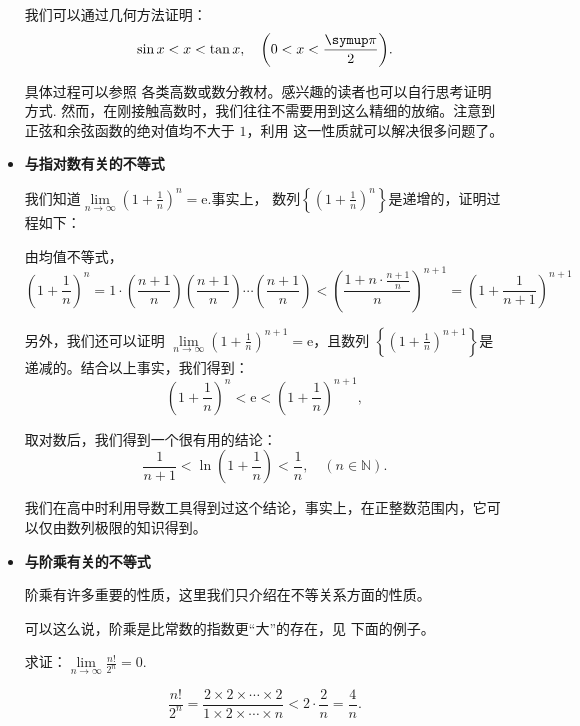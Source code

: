 \begin{itemize}
          我们可以通过几何方法证明：
          \[
              \sin x<x<\tan x,\quad\left( 0<x<\frac{\symup\pi}{2} \right)
              .\]

          具体过程可以参照%
          各类高数或数分教材。感兴趣的读者也可以自行思考证明方式.
          然而，在刚接触高数时，我们往往不需要用到这么精细的放缩。注意到正弦和余弦函数的绝对值均不大于 $1$，利用
          这一性质就可以解决很多问题了。

    \item \textbf{与指对数有关的不等式}

          我们知道$\lim\limits_{n \to \infty}\left (1+\frac{1}{n}\right )^n=\mathrm e$.事实上，
          数列$\left\{ \left (1+\frac{1}{n}\right )^n  \right\} $是递增的，证明过程如下：
          \begin{prove}
              由均值不等式，
              \begin{equation}
                  \left (1+\frac{1}{n}\right )^n=1\cdot \left (\frac{n+1}{n}\right )\left (\frac{n+1}{n}\right )
                  \cdots \left (\frac{n+1}{n}\right )<
                  \left (\frac{1+n\cdot \frac{n+1}{n}}{n}\right )^{n+1}=\left (1+\frac{1}{n+1}\right )^{n+1}\label{与指对数有关的不等式}
              \end{equation}
          \end{prove}


          另外，我们还可以证明 $\lim\limits_{n \to \infty}\left (1+\frac{1}{n}\right )^{n+1}=\mathrm e$，且数列
          $\left\{  \left (1+\frac{1}{n}\right )^{n+1} \right\}  $是递减的。结合以上事实，我们得到：
          \[
              \left (1+\frac{1}{n}\right )^n<\mathrm e<\left (1+\frac{1}{n}\right )^{n+1\!\!\!\!\!\!\!\!\!\!\!\!}
              ,\]


          取对数后，我们得到一个很有用的结论：
          \[
              \frac{1}{n+1}<\ln \left( 1+\frac{1}{n} \right) <\frac{1}{n}, \quad (n\in \mathbb{N} ).
          \]


          我们在高中时利用导数工具得到过这个结论，事实上，在正整数范围内，它可以仅由数列极限的知识得到。

    \item \textbf{与阶乘有关的不等式}

          阶乘有许多重要的性质，这里我们只介绍在不等关系方面的性质。

          可以这么说，阶乘是比常数的指数更“大”的存在，见     下面的例子。
          \begin{example}
              求证：$\lim\limits_{n \to \infty} \frac{n!}{2^n} =0$.
          \end{example}
          \begin{prove}
              \[
                  \frac{n!}{2^n}=\frac{2\times 2\times \cdots\times 2}{1\times 2\times \cdots\times n}
                  <2\cdot \frac{2}{n}=\frac{4}{n}
                  .\]


\end{prove}
\end{itemize}

